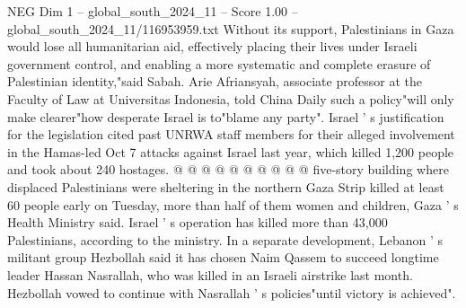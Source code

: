 \begin{textsample}{NEG Dim 1 – global\_south\_2024\_11 – Score 1.00 – global\_south\_2024\_11/116953959.txt}
Without its support, Palestinians in Gaza would lose all humanitarian aid, effectively placing their lives under Israeli government control, and enabling a more systematic and complete erasure of Palestinian identity,"said Sabah.
Arie Afriansyah, associate professor at the Faculty of Law at Universitas Indonesia, told China Daily such a policy"will only make clearer"how desperate Israel is to"blame any party".
Israel ' s justification for the legislation cited past UNRWA staff members for their alleged involvement in the Hamas-led Oct 7 attacks against Israel last year, which killed 1,200 people and took about 240 hostages. @ @ @ @ @ @ @ @ @ @ five-story building where displaced Palestinians were sheltering in the northern Gaza Strip killed at least 60 people early on Tuesday, more than half of them women and children, Gaza ' s Health Ministry said.
Israel ' s operation has killed more than 43,000 Palestinians, according to the ministry.
In a separate development, Lebanon ' s militant group Hezbollah said it has chosen Naim Qassem to succeed longtime leader Hassan Nasrallah, who was killed in an Israeli airstrike last month.
Hezbollah vowed to continue with Nasrallah ' s policies"until victory is achieved".

\end{textsample}
